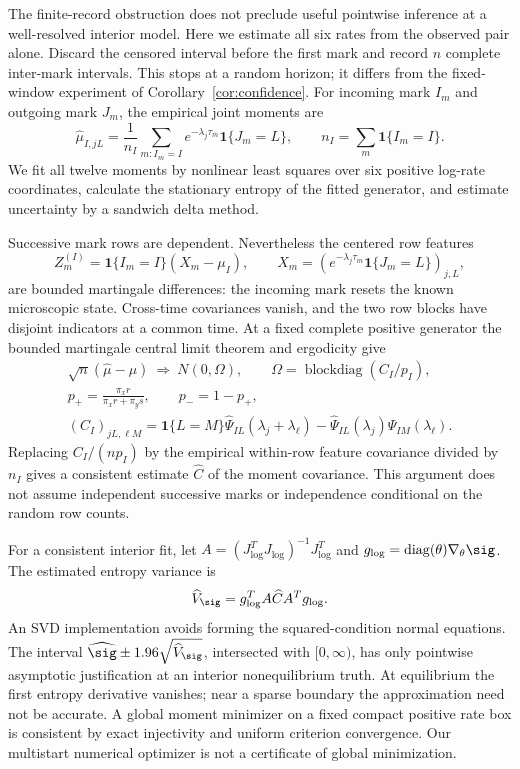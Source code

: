 The finite-record obstruction does not preclude useful pointwise inference
at a well-resolved interior model. Here we estimate all six rates from the
observed pair alone. Discard the censored interval before the first mark and
record $n$ complete inter-mark intervals. This stops at a random horizon;
it differs from the fixed-window experiment of Corollary~\ref{cor:confidence}.
For incoming mark $I_m$ and outgoing mark $J_m$, the empirical joint moments are
\begin{equation}
 \widehat\mu_{I,jL}
 =\frac1{n_I}\sum_{m:I_m=I}
 e^{-\lambda_j\tau_m}\mathbf1\{J_m=L\},
 \qquad n_I=\sum_m\mathbf1\{I_m=I\}.\label{eq:empirical-laplace}
\end{equation}
We fit all twelve moments by nonlinear least squares over six positive
log-rate coordinates, calculate the stationary entropy of the fitted
generator, and estimate uncertainty by a sandwich delta method.

Successive mark rows are dependent. Nevertheless the centered row features
\begin{equation}
 Z_m^{(I)}=\mathbf1\{I_m=I\}(X_m-\mu_I),\qquad
 X_m=(e^{-\lambda_j\tau_m}\mathbf1\{J_m=L\})_{j,L},
\end{equation}
are bounded martingale differences: the incoming mark resets the known
microscopic state. Cross-time covariances vanish, and the two row blocks
have disjoint indicators at a common time. At a fixed complete positive
generator the bounded martingale central limit theorem and ergodicity give
\begin{gather}
 \sqrt n(\widehat\mu-\mu)\ \Rightarrow\ N(0,\Omega),\qquad
 \Omega=\operatorname{blockdiag}(C_I/p_I),\label{eq:moment-clt}\\
 p_+=\frac{\pi_xr}{\pi_xr+\pi_ys},\qquad p_-=1-p_+,\\
 (C_I)_{jL,\ell M}
 =\mathbf1\{L=M\}\widehat\Psi_{IL}(\lambda_j+\lambda_\ell)
  -\widehat\Psi_{IL}(\lambda_j)\widehat\Psi_{IM}(\lambda_\ell).
 \label{eq:moment-covariance}
\end{gather}
Replacing $C_I/(np_I)$ by the empirical within-row feature covariance divided
by $n_I$ gives a consistent estimate $\widehat C$ of the moment covariance.
This argument does not assume independent successive marks or independence
conditional on the random row counts.

For a consistent interior fit, let
$A=(J_{\log}^T J_{\log})^{-1}J_{\log}^T$ and
$g_{\log}=\operatorname{diag}(\theta)\nabla_\theta\sig$. The estimated
entropy variance is
\begin{equation}
 \widehat V_\sig=g_{\log}^T A\widehat C A^Tg_{\log}.
 \label{eq:entropy-delta}
\end{equation}
An SVD implementation avoids forming the squared-condition normal equations.
The interval $\widehat\sig\pm1.96\sqrt{\widehat V_\sig}$, intersected with
$[0,\infty)$, has only pointwise asymptotic justification at an interior
nonequilibrium truth. At equilibrium the first entropy derivative vanishes;
near a sparse boundary the approximation need not be accurate. A global
moment minimizer on a fixed compact positive rate box is consistent by exact
injectivity and uniform criterion convergence. Our multistart numerical
optimizer is not a certificate of global minimization.

